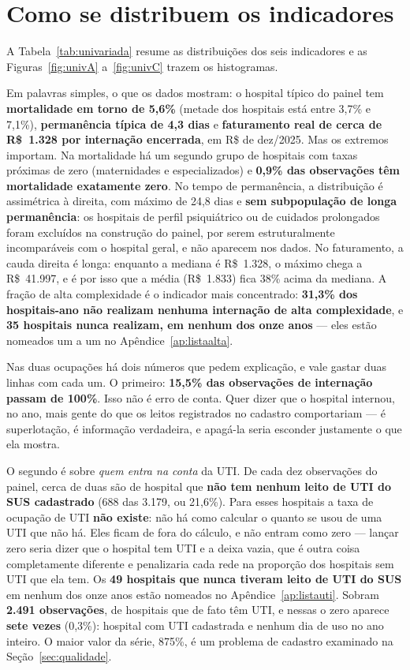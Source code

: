 \section{Como se distribuem os indicadores}
\label{sec:univariada}

A Tabela~\ref{tab:univariada} resume as distribuições dos seis
indicadores e as Figuras~\ref{fig:univA} a~\ref{fig:univC} trazem os
histogramas.

Em palavras simples, o que os dados mostram: o hospital típico do
painel tem \textbf{mortalidade em torno de 5,6\%} (metade dos hospitais
está entre 3,7\% e 7,1\%), \textbf{permanência típica de 4,3 dias} e
\textbf{faturamento real de cerca de R\$~1.328 por internação
encerrada}, em R\$ de dez/2025. Mas os
extremos importam. Na mortalidade há um segundo grupo de hospitais com
taxas próximas de zero (maternidades e especializados) e \textbf{0,9\%
das observações têm mortalidade exatamente zero}. No tempo de
permanência, a distribuição é assimétrica à direita, com máximo de
24,8 dias e \textbf{sem subpopulação de longa permanência}: os
hospitais de perfil psiquiátrico ou de cuidados prolongados foram
excluídos na construção do painel, por serem estruturalmente
incomparáveis com o hospital geral, e não aparecem nos dados. No faturamento, a cauda direita é longa: enquanto a mediana é
R\$~1.328, o máximo chega a R\$~41.997, e é por isso que a média
(R\$~1.833) fica 38\% acima da mediana. A fração de alta complexidade é
o indicador mais concentrado: \textbf{31,3\% dos hospitais-ano não
realizam nenhuma internação de alta complexidade}, e \textbf{35 hospitais
nunca realizam, em nenhum dos onze anos} --- eles estão nomeados um a um
no Apêndice~\ref{ap:listaalta}.

Nas duas ocupações há dois números que pedem explicação, e vale gastar
duas linhas com cada um. O primeiro: \textbf{15,5\% das observações de
internação passam de 100\%}. Isso não é erro de conta. Quer dizer que o
hospital internou, no ano, mais gente do que os leitos registrados no
cadastro comportariam --- é superlotação, é informação verdadeira, e
apagá-la seria esconder justamente o que ela mostra.

O segundo é sobre \emph{quem entra na conta} da UTI. De cada dez
observações do painel, cerca de duas são de hospital que \textbf{não tem
nenhum leito de UTI do SUS cadastrado} (688 das 3.179, ou 21,6\%). Para
esses hospitais a taxa de ocupação de UTI \textbf{não existe}: não há
como calcular o quanto se usou de uma UTI que não há. Eles ficam de fora
do cálculo, e não entram como zero --- lançar zero seria dizer que o
hospital tem UTI e a deixa vazia, que é outra coisa completamente
diferente e penalizaria cada rede na proporção dos hospitais sem UTI que
ela tem. Os \textbf{49 hospitais que nunca tiveram leito de UTI do SUS}
em nenhum dos onze anos estão nomeados no Apêndice~\ref{ap:listauti}.
Sobram \textbf{2.491 observações}, de hospitais que de fato têm UTI, e
nessas o zero aparece \textbf{sete vezes} (0,3\%): hospital com UTI
cadastrada e nenhum dia de uso no ano inteiro. O maior valor da série,
875\%, é um problema de cadastro examinado na
Seção~\ref{sec:qualidade}.

